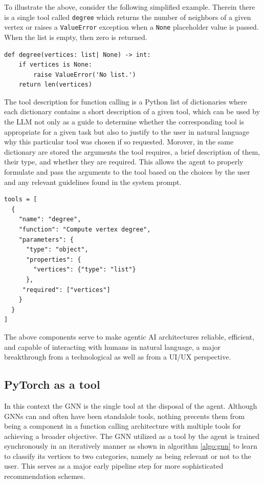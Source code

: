 \documentclass[conference, compsoc, final]{IEEEtran}
\begin{document}
To illustrate the above, consider the following simplified example. Therein there is a single tool called \lstinline+degree+ which returns the number of neighbors of a given vertex or raises a \lstinline+ValueError+ exception when a \lstinline+None+ placeholder value is passed. When the list is empty, then zero is returned.
\begin{lstlisting}
def degree(vertices: list| None) -> int:
    if vertices is None:
        raise ValueError('No list.')
    return len(vertices)
\end{lstlisting}

The tool description for function calling is a Python list of dictionaries where each dictionary contains a short description of a given tool, which can be used by the LLM not only as a guide to determine whether the corresponding tool is appropriate for a given task but also to justify to the user in natural language why this particular tool was chosen if so requested. Morover, in the same dictionary are stored the arguments the tool requires, a brief description of them, their type, and whether they are required. This allows the agent to properly formulate and pass the arguments to the tool based on the choices by the user and any relevant guidelines found in the system prompt.
\begin{lstlisting}
tools = [
  {
    "name": "degree",
    "function": "Compute vertex degree",
    "parameters": {
      "type": "object",
      "properties": {
        "vertices": {"type": "list"}
      },
     "required": ["vertices"]
    }
  }
]
\end{lstlisting}

The above components serve to make agentic AI architectures reliable, efficient, and capable of interacting with humans in natural language, a major breakthrough from a technological as well as from a UI/UX perspective.


\subsection{PyTorch as a tool}

In this context the GNN is the single tool at the disposal of the agent. Although GNNs can and often have been standalole tools, nothing precents them from being a component in a function calling architecture with multiple tools for achieving a broader objective. The GNN utilized as a tool by the agent is trained synchronously in an iteratively manner as shown in algorithm \ref{algo:gnn} to learn to classify its vertices to two categories, namely as being relevant or not to the user. This serves as a major early pipeline step for more sophisticated recommendation schemes. 
\end{document}
